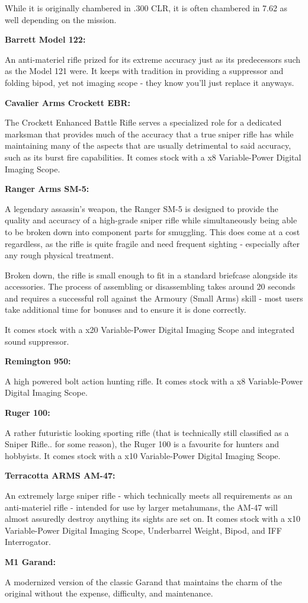 \begin{multicols}{2}
\begin{breakbox}
	While it is originally chambered in .300 CLR, it is often chambered in 7.62 as well depending on the mission.
	
	\textbf{Barrett Model 122:}
	
	An anti-materiel rifle prized for its extreme accuracy just as its predecessors such as the Model 121 were. It keeps with tradition in providing a suppressor and folding bipod, yet not imaging scope - they know you'll just replace it anyways.
	
	\textbf{Cavalier Arms Crockett EBR:}
	
	The Crockett Enhanced Battle Rifle serves a specialized role for a dedicated marksman that provides much of the accuracy that a true sniper rifle has while maintaining many of the aspects that are usually detrimental to said accuracy, such as its burst fire capabilities. It comes stock with a x8 Variable-Power Digital Imaging Scope.
	
	\textbf{Ranger Arms SM-5:}
	
	A legendary assassin's weapon, the Ranger SM-5 is designed to provide the quality and accuracy of a high-grade sniper rifle while simultaneously being able to be broken down into component parts for smuggling. This does come at a cost regardless, as the rifle is quite fragile and need frequent sighting - especially after any rough physical treatment.
	
	Broken down, the rifle is small enough to fit in a standard briefcase alongside its accessories. The process of assembling or disassembling takes around 20 seconds and requires a successful roll against the Armoury (Small Arms) skill - most users take additional time for bonuses and to ensure it is done correctly.
	
	It comes stock with a x20 Variable-Power Digital Imaging Scope and integrated sound suppressor.
	
	\textbf{Remington 950:}
	
	A high powered bolt action hunting rifle. It comes stock with a x8 Variable-Power Digital Imaging Scope.
	
	\textbf{Ruger 100:}
	
	A rather futuristic looking sporting rifle (that is technically still classified as a Sniper Rifle.. for some reason), the Ruger 100 is a favourite for hunters and hobbyists. It comes stock with a x10 Variable-Power Digital Imaging Scope.
	
	\textbf{Terracotta ARMS AM-47:}
	
	An extremely large sniper rifle - which technically meets all requirements as an anti-materiel rifle - intended for use by larger metahumans, the AM-47 will almost assuredly destroy anything its sights are set on. It comes stock with a x10 Variable-Power Digital Imaging Scope, Underbarrel Weight, Bipod, and IFF Interrogator.
	
	\textbf{M1 Garand:}
	
	A modernized version of the classic Garand that maintains the charm of the original without the expense, difficulty, and maintenance.
		
\end{breakbox}
\end{multicols}

